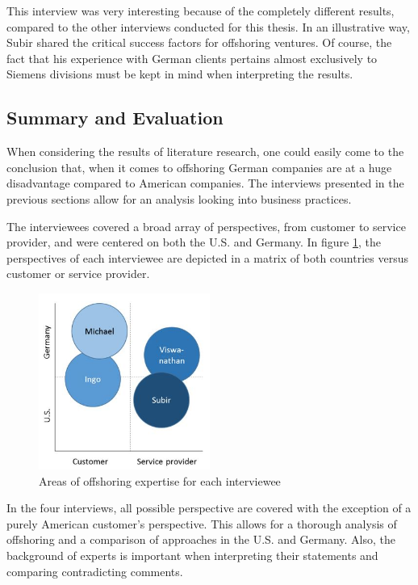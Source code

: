 This interview was very interesting because of the completely different results, compared to the other interviews conducted for this thesis. In an illustrative way, Subir shared the critical success factors for offshoring ventures. Of course, the fact that his experience with German clients pertains almost exclusively to Siemens divisions must be kept in mind when interpreting the results.

\subsection{Summary and Evaluation}

When considering the results of literature research, one could easily come to the conclusion that, when it comes to offshoring German companies are at a huge disadvantage compared to American companies. The interviews presented in the previous sections allow for an analysis looking into business practices. 

The interviewees covered a broad array of perspectives, from customer to service provider, and were centered on both the U.S. and Germany. In figure \ref{fig:Viewpoints}, the perspectives of each interviewee are depicted in a matrix of both countries versus customer or service provider. 

\begin{figure}[htb]
		\centering
		\includegraphics[width=0.5\textwidth]{Pictures/Viewpoints}
		\caption{Areas of offshoring expertise for each interviewee}
		\label{fig:Viewpoints}
\end{figure}

In the four interviews, all possible perspective are covered with the exception of a purely American customer's perspective. This allows for a thorough analysis of offshoring and a comparison of approaches in the U.S. and Germany. Also, the background of experts is important when interpreting their statements and comparing contradicting comments.


